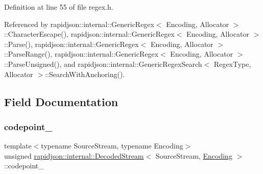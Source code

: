 Definition at line 55 of file regex.\+h.


\begin{DoxyCode}{0}

\end{DoxyCode}


Referenced by rapidjson\+::internal\+::\+Generic\+Regex$<$ Encoding, Allocator $>$\+::\+Character\+Escape(), rapidjson\+::internal\+::\+Generic\+Regex$<$ Encoding, Allocator $>$\+::\+Parse(), rapidjson\+::internal\+::\+Generic\+Regex$<$ Encoding, Allocator $>$\+::\+Parse\+Range(), rapidjson\+::internal\+::\+Generic\+Regex$<$ Encoding, Allocator $>$\+::\+Parse\+Unsigned(), and rapidjson\+::internal\+::\+Generic\+Regex\+Search$<$ Regex\+Type, Allocator $>$\+::\+Search\+With\+Anchoring().



\subsection{Field Documentation}
\mbox{\label{classrapidjson_1_1internal_1_1_decoded_stream_a3a10e5ba9d127706d9168e2ce6d3811c}} 
\subsubsection{\texorpdfstring{codepoint\_}{codepoint\_}}
{\footnotesize\ttfamily template$<$typename Source\+Stream, typename Encoding$>$ \\
unsigned \mbox{\hyperlink{classrapidjson_1_1internal_1_1_decoded_stream}{rapidjson\+::internal\+::\+Decoded\+Stream}}$<$ Source\+Stream, \mbox{\hyperlink{classrapidjson_1_1_encoding}{Encoding}} $>$\+::codepoint\+\_\+\hspace{0.3cm}{\ttfamily [private]}}



